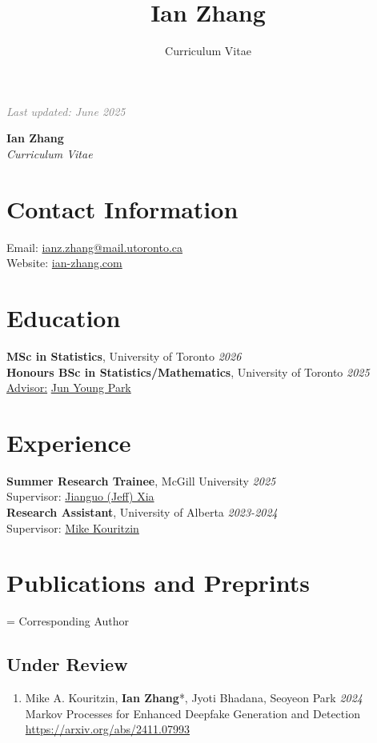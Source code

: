 \documentclass[11pt]{article}
\title{Ian Zhang}
\author{Curriculum Vitae}
\theoremstyle{definition}
\newcommand{\1}{\mathds 1}
\begin{document}
\hfill {\scriptsize\textit{\textcolor{gray}{Last updated: June 2025}}}
\begin{center}
    {\huge \textbf{Ian Zhang}}\\
    \textit{Curriculum Vitae}
\end{center}

\section*{Contact Information}
Email: \href{mailto:ianz.zhang@mail.utoronto.ca}{ianz.zhang@mail.utoronto.ca}\\
Website: \href{www.ian-zhang.com}{ian-zhang.com}

\section*{Education}
\textbf{MSc in Statistics}, University of Toronto \hfill \textit{2026}\\
\textbf{Honours BSc in Statistics/Mathematics}, University of Toronto \hfill \textit{2025}\\
\indent\hspace{0.2cm} \underline{Advisor:} \href{https://junjypark.github.io/}{Jun Young Park}

\section*{Experience}
\textbf{Summer Research Trainee}, McGill University \hfill \textit{2025}\\
\indent\hspace{0.2cm} Supervisor: \href{https://www.xialab.ca/}{Jianguo (Jeff) Xia}\\
\textbf{Research Assistant}, University of Alberta \hfill \textit{2023-2024}\\
\indent\hspace{0.2cm} Supervisor: \href{https://www.math.ualberta.ca/~mkouritz/Kouritzin_M.html}{Mike Kouritzin}

\section*{Publications and Preprints}
{\small* = Corresponding Author}
\subsection*{Under Review}
\begin{enumerate}
    \item Mike A. Kouritzin, \textbf{Ian Zhang}*, Jyoti Bhadana, Seoyeon Park \hfill \textit{2024}\\
    Markov Processes for Enhanced Deepfake Generation and Detection \\
    \url{https://arxiv.org/abs/2411.07993}
\end{enumerate}
\end{document}
